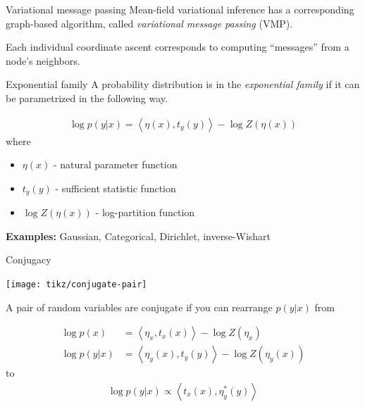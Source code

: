 \documentclass[10pt, compress]{beamer}
\begin{document}
\begin{frame}{Variational message passing}
  Mean-field variational inference has a corresponding
  graph-based algorithm, called \emph{variational message passing} (VMP).
  
  \pause
  
  Each individual coordinate ascent corresponds to
  computing ``messages'' from a node's neighbors.

  \begin{center}
  \end{center}

\end{frame}

\iffalse
\begin{frame}{Exponential family}
  A probability distribution is in the \emph{exponential family}
  if it can be parametrized in the following way.

  \pause

  \begin{align*}
    \log p(y | x) = \left\langle\eta(x), t_y(y)\right\rangle - \log Z(\eta(x))
  \end{align*}
  where
  \begin{itemize}
      \pause
    \item $\eta(x)$ - natural parameter function
      \pause
    \item $t_y(y)$ - sufficient statistic function
      \pause
    \item $\log Z(\eta(x))$ - log-partition function
  \end{itemize}
  \pause
  \textbf{Examples:} Gaussian, Categorical, Dirichlet, inverse-Wishart
\end{frame}

\begin{frame}{Conjugacy}
   \begin{center}
        \texttt{[image: tikz/conjugate-pair]}
   \end{center}
   A pair of random variables are conjugate if
   you can rearrange $p(y | x)$ from

  \pause

  \begin{align*}
    \log p(x) &= \left\langle\eta_x, t_x(x)\right\rangle - \log Z(\eta_x) \\
    \log p(y | x) &= \left\langle\eta_y(x), t_y(y)\right\rangle - \log Z(\eta_y(x))
  \end{align*}
  to
  \pause
  \begin{align*}
    \log p(y | x) \propto \left\langle t_x(x), \eta^*_y(y)\right\rangle
  \end{align*}
\end{frame}
\end{document}
